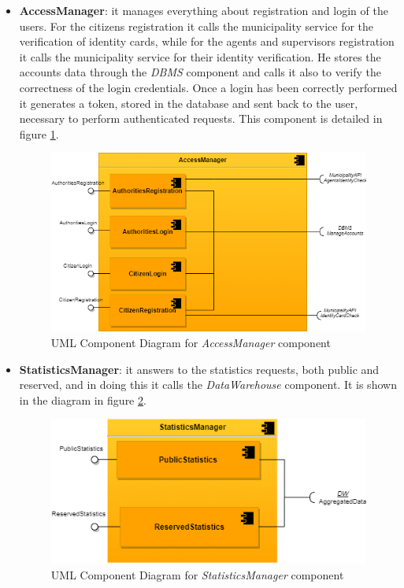 \documentclass[a4paper]{report}
\begin{document}
\begin{itemize}
\item \textbf{AccessManager}: it manages everything about registration and login of the users. For the citizens registration it calls the municipality service for the verification of identity cards, while for the agents and supervisors registration it calls the municipality service for their identity verification. He stores the accounts data through the \textit{DBMS} component and calls it also to verify the correctness of the login credentials. Once a login has been correctly performed it generates a token, stored in the database and sent back to the user, necessary to perform authenticated requests. This component is detailed in figure \ref{fig:accessmgr-component}.

\begin{figure}[htp]
\includegraphics[width=\textwidth]{AccessManager}
\caption{UML Component Diagram for \textit{AccessManager} component}
\label{fig:accessmgr-component}
\end{figure}

\item \textbf{StatisticsManager}: it answers to the statistics requests, both public and reserved, and in doing this it calls the \textit{DataWarehouse} component. It is shown in the diagram in figure \ref{fig:statisticsmgr-component}.

\begin{figure}[htp]
\includegraphics[width=\textwidth]{StatisticsManager}
\caption{UML Component Diagram for \textit{StatisticsManager} component}
\label{fig:statisticsmgr-component}
\end{figure}


\end{itemize}
\end{document}
